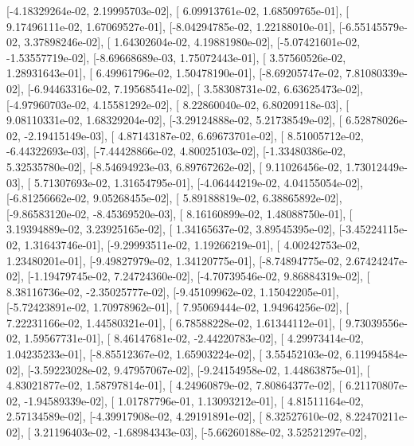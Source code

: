 \documentclass{article}
\begin{document}
       [-4.18329264e-02,  2.19995703e-02],
       [ 6.09913761e-02,  1.68509765e-01],
       [ 9.17496111e-02,  1.67069527e-01],
       [-8.04294785e-02,  1.22188010e-01],
       [-6.55145579e-02,  3.37898246e-02],
       [ 1.64302604e-02,  4.19881980e-02],
       [-5.07421601e-02, -1.53557719e-02],
       [-8.69668689e-03,  1.75072443e-01],
       [ 3.57560526e-02,  1.28931643e-01],
       [ 6.49961796e-02,  1.50478190e-01],
       [-8.69205747e-02,  7.81080339e-02],
       [-6.94463316e-02,  7.19568541e-02],
       [ 3.58308731e-02,  6.63625473e-02],
       [-4.97960703e-02,  4.15581292e-02],
       [ 8.22860040e-02,  6.80209118e-03],
       [ 9.08110331e-02,  1.68329204e-02],
       [-3.29124888e-02,  5.21738549e-02],
       [ 6.52878026e-02, -2.19415149e-03],
       [ 4.87143187e-02,  6.69673701e-02],
       [ 8.51005712e-02, -6.44322693e-03],
       [-7.44428866e-02,  4.80025103e-02],
       [-1.33480386e-02,  5.32535780e-02],
       [-8.54694923e-03,  6.89767262e-02],
       [ 9.11026456e-02,  1.73012449e-03],
       [ 5.71307693e-02,  1.31654795e-01],
       [-4.06444219e-02,  4.04155054e-02],
       [-6.81256662e-02,  9.05268455e-02],
       [ 5.89188819e-02,  6.38865892e-02],
       [-9.86583120e-02, -8.45369520e-03],
       [ 8.16160899e-02,  1.48088750e-01],
       [ 3.19394889e-02,  3.23925165e-02],
       [ 1.34165637e-02,  3.89545395e-02],
       [-3.45224115e-02,  1.31643746e-01],
       [-9.29993511e-02,  1.19266219e-01],
       [ 4.00242753e-02,  1.23480201e-01],
       [-9.49827979e-02,  1.34120775e-01],
       [-8.74894775e-02,  2.67424247e-02],
       [-1.19479745e-02,  7.24724360e-02],
       [-4.70739546e-02,  9.86884319e-02],
       [ 8.38116736e-02, -2.35025777e-02],
       [-9.45109962e-02,  1.15042205e-01],
       [-5.72423891e-02,  1.70978962e-01],
       [ 7.95069444e-02,  1.94964256e-02],
       [ 7.22231166e-02,  1.44580321e-01],
       [ 6.78588228e-02,  1.61344112e-01],
       [ 9.73039556e-02,  1.59567731e-01],
       [ 8.46147681e-02, -2.44220783e-02],
       [ 4.29973414e-02,  1.04235233e-01],
       [-8.85512367e-02,  1.65903224e-02],
       [ 3.55452103e-02,  6.11994584e-02],
       [-3.59223028e-02,  9.47957067e-02],
       [-9.24154958e-02,  1.44863875e-01],
       [ 4.83021877e-02,  1.58797814e-01],
       [ 4.24960879e-02,  7.80864377e-02],
       [ 6.21170807e-02, -1.94589339e-02],
       [ 1.01787796e-01,  1.13093212e-01],
       [ 4.81511164e-02,  2.57134589e-02],
       [-4.39917908e-02,  4.29191891e-02],
       [ 8.32527610e-02,  8.22470211e-02],
       [ 3.21196403e-02, -1.68984343e-03],
       [-5.66260188e-02,  3.52521297e-02],
\end{document}
